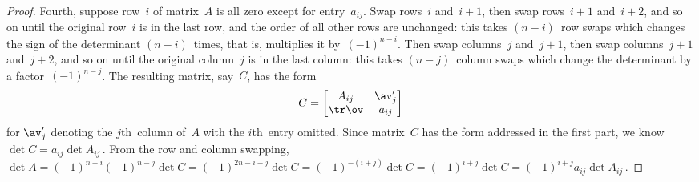 \begin{proof}
Fourth, suppose row~\(i\) of matrix~\(A\) is all zero except for entry~\(a_{ij}\).
Swap rows~\(i\) and~\(i+1\), then swap rows~\(i+1\) and~\(i+2\), and so on until the original row~\(i\) is in the last row, and the order of all other rows are unchanged: this takes \((n-i)\)~row swaps which changes the sign of the determinant \((n-i)\)~times, that is, multiplies it by~\((-1)^{n-i}\).
Then swap columns~\(j\) and~\(j+1\), then swap columns~\(j+1\) and~\(j+2\), and so on until the original column~\(j\) is in the last column: this takes \((n-j)\)~column swaps which change the determinant by a factor~\((-1)^{n-j}\).
The resulting matrix, say~\(C\), has the form
\begin{equation*}
C=\begin{bmatrix} A_{ij}&\av'_j\\\tr\ov&a_{ij} \end{bmatrix}
\end{equation*}
for \(\av'_j\) denoting the \(j\)th~column of~\(A\) with the \(i\)th~entry omitted.
Since matrix~\(C\) has the form addressed in the first part, we know \(\det C=a_{ij}\det A_{ij}\)\,.
From the row and column swapping, \(\det A=(-1)^{n-i}(-1)^{n-j}\det C =(-1)^{2n-i-j}\det C =(-1)^{-(i+j)}\det C =(-1)^{i+j}\det C =(-1)^{i+j}a_{ij}\det A_{ij}\)\,.
\end{proof}




